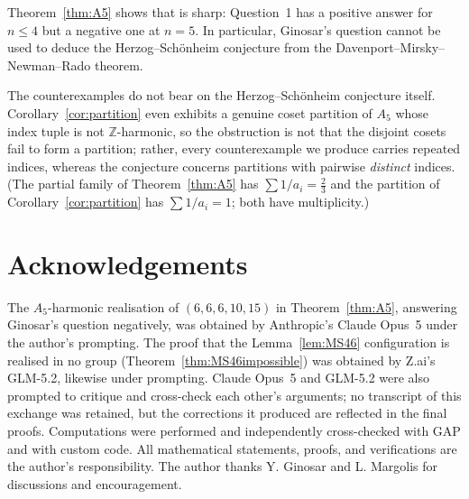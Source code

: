 \documentclass[12pt]{article}
\theoremstyle{remark}
\newcommand{\Z}{\mathbb{Z}}
\begin{document}
Theorem~\ref{thm:A5} shows that \cite[Theorem~B]{MargolisSchnabel} is sharp: Question~1 has a positive answer for $n\le 4$ but a negative one at $n=5$. In particular, Ginosar's question cannot be used to deduce the Herzog--Sch\"onheim conjecture from the Davenport--Mirsky--Newman--Rado theorem.

The counterexamples do not bear on the Herzog--Sch\"onheim conjecture itself. Corollary~\ref{cor:partition} even exhibits a genuine coset partition of $A_5$ whose index tuple is not $\Z$-harmonic, so the obstruction is not that the disjoint cosets fail to form a partition; rather, every counterexample we produce carries repeated indices, whereas the conjecture concerns partitions with pairwise \emph{distinct} indices. (The partial family of Theorem~\ref{thm:A5} has $\sum 1/a_i=\tfrac23$ and the partition of Corollary~\ref{cor:partition} has $\sum 1/a_i=1$; both have multiplicity.)

\section*{Acknowledgements}

The $A_5$-harmonic realisation of $(6,6,6,10,15)$ in Theorem~\ref{thm:A5}, answering Ginosar's question negatively, was obtained by Anthropic's Claude Opus~5 under the author's prompting. The proof that the Lemma~\ref{lem:MS46} configuration is realised in no group (Theorem~\ref{thm:MS46impossible}) was obtained by Z.ai's GLM-5.2, likewise under prompting. Claude Opus~5 and GLM-5.2 were also prompted to critique and cross-check each other's arguments; no transcript of this exchange was retained, but the corrections it produced are reflected in the final proofs. Computations were performed and independently cross-checked with GAP \cite{GAP} and with custom code. All mathematical statements, proofs, and verifications are the author's responsibility. The author thanks Y. Ginosar and L. Margolis for discussions and encouragement.
\end{document}

